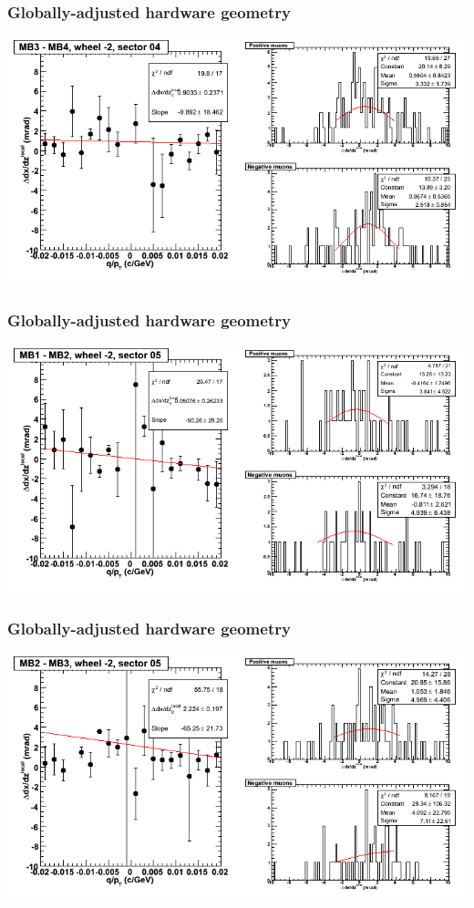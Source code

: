 \documentclass[compress]{beamer}
\begin{document}
\begin{frame}
\frametitle{Globally-adjusted hardware geometry}
\includegraphics[width=\linewidth]{NOV4_segdiffs_HW/dt13_slope_A_04_34.png}
\end{frame}

\begin{frame}
\frametitle{Globally-adjusted hardware geometry}
\includegraphics[width=\linewidth]{NOV4_segdiffs_HW/dt13_slope_A_05_12.png}
\end{frame}

\begin{frame}
\frametitle{Globally-adjusted hardware geometry}
\includegraphics[width=\linewidth]{NOV4_segdiffs_HW/dt13_slope_A_05_23.png}
\end{frame}
\end{document}
